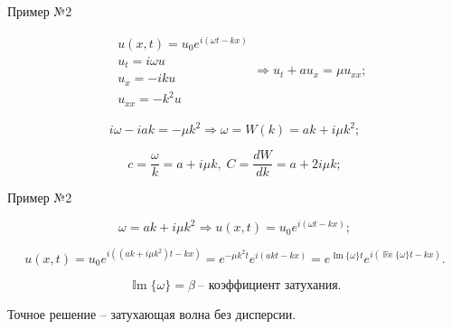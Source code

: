 \documentclass[10pt,xcolor=pst,aspectratio=169]{beamer}
\begin{document}
\begin{frame}{Пример №2}

    \transdissolve[duration=0.1]
    \justifying
    \large

    \[
        \boxed{
            \begin{split}
                &u \left( x, t \right) = u_{0} e^{i \left( \omega t - k x \right)} \\
                &u_{t} = i \omega u \\
                &u_{x} = - i k u \\
                &u_{xx} = - k^{2} u
            \end{split}
        }
        \Rightarrow
        \boxed{
            u_{t} + a u_{x} = \mu u_{xx}
        };
    \]

    \[
        i \omega - i a k = - \mu k^{2}
        \Rightarrow
        \omega = W \left( k \right) = a k + \boxed{i \mu k^{2}};
    \]

    \[
        c = \frac{\omega}{k} = a + \boxed{i \mu k}, \; C = \frac{d W}{d k} = a + 2 i \mu k;
    \]

\end{frame}

\begin{frame}{Пример №2}

    \transdissolve[duration=0.1]
    \justifying
    \large

    \[
         \omega = a k + i \mu k^{2} \Rightarrow u \left( x, t \right) = u_{0} e^{i \left( \omega t - k x \right)};
    \]

    \[
        u \left( x, t \right) = u_{0} e^{i \left( \left( a k + i \mu k^{2} \right) t - k x \right)} = e^{- \mu k^{2} t} e^{i \left( a k t - k x \right)} = e^{\operatorname{\mathbb{I}m}\{\omega\} t} e^{i \left( \operatorname{\mathbb{R}e}\{\omega\} t - k x \right)}.
    \]

    \[
        \operatorname{\mathbb{I}m}\{\omega\} = \beta \: \mbox{-- коэффициент затухания}.
    \]

    \begin{center}
        Точное решение -- затухающая волна без дисперсии.
    \end{center}

\end{frame}
\end{document}
